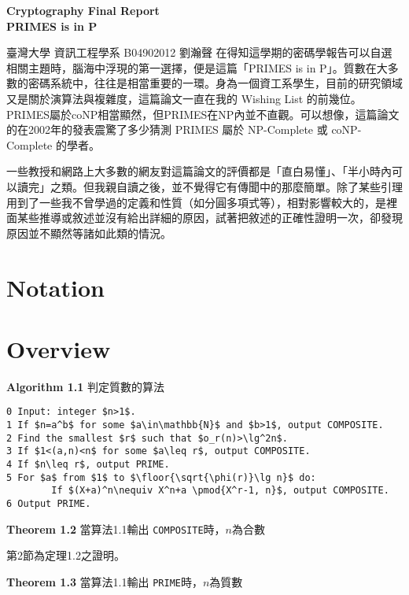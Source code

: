 \documentclass{article}
\DeclarePairedDelimiter\floor{\lfloor}{\rfloor}
\newcommand{\nequiv}{\not\equiv}
\begin{document}
\fontsize{12pt}{20pt}\selectfont
\begin{center}
	\bfseries\huge{Cryptography Final Report\\PRIMES is in P}\\
\end{center}
{
    \hfill 臺灣大學 資訊工程學系 B04902012 劉瀚聲
}
    在得知這學期的密碼學報告可以自選相關主題時，腦海中浮現的第一選擇，便是這篇「PRIMES is in P」。質數在大多數的密碼系統中，往往是相當重要的一環。身為一個資工系學生，目前的研究領域又是關於演算法與複雜度，這篇論文一直在我的 Wishing List 的前幾位。PRIMES屬於coNP相當顯然，但PRIMES在NP內並不直觀。可以想像，這篇論文的在2002年的發表震驚了多少猜測 PRIMES 屬於 NP-Complete 或 coNP-Complete 的學者。

    一些教授和網路上大多數的網友對這篇論文的評價都是「直白易懂」、「半小時內可以讀完」之類。但我親自讀之後，並不覺得它有傳聞中的那麼簡單。除了某些引理用到了一些我不曾學過的定義和性質（如分圓多項式等），相對影響較大的，是裡面某些推導或敘述並沒有給出詳細的原因，試著把敘述的正確性證明一次，卻發現原因並不顯然等諸如此類的情況。
\section{Notation}
\section{Overview}
\begin{mdframed}
\noindent\textbf{Algorithm 1.1} 判定質數的算法
\begin{lstlisting}[mathescape=true]
0 Input: integer $n>1$.
1 If $n=a^b$ for some $a\in\mathbb{N}$ and $b>1$, output COMPOSITE.
2 Find the smallest $r$ such that $o_r(n)>\lg^2n$.
3 If $1<(a,n)<n$ for some $a\leq r$, output COMPOSITE.
4 If $n\leq r$, output PRIME.
5 For $a$ from $1$ to $\floor{\sqrt{\phi(r)}\lg n}$ do:
        If $(X+a)^n\nequiv X^n+a \pmod{X^r-1, n}$, output COMPOSITE.
6 Output PRIME.
\end{lstlisting}
\end{mdframed}

\begin{mdframed}
\noindent\textbf{Theorem 1.2} 當算法1.1輸出 \texttt{COMPOSITE}時，$n$為合數
\end{mdframed}

    第2節為定理1.2之證明。

\begin{mdframed}
\noindent\textbf{Theorem 1.3} 當算法1.1輸出 \texttt{PRIME}時，$n$為質數
\end{mdframed}
\end{document}
